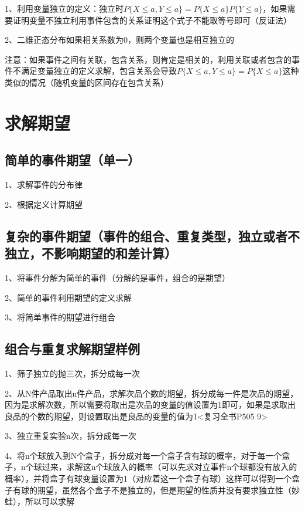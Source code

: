 1、利用变量独立的定义：独立时$P\{X \le a, Y \le a\} = P\{X \le a\}P\{Y \le a\}$，如果需要证明变量不独立利用事件包含的关系证明这个式子不能取等号即可（反证法）

2、二维正态分布如果相关系数为0，则两个变量也是相互独立的

注意：如果事件之间有关联，包含关系，则肯定是相关的，利用关联或者包含的事件不满足变量独立的定义求解，包含关系会导致$P\{X \le a, Y \le a\} = P\{X \le a\}$这种类似的情况（随机变量的区间存在包含关系）

\section{求解期望}



\subsection{简单的事件期望（单一）}

1、求解事件的分布律

2、根据定义计算期望



\subsection{复杂的事件期望（事件的组合、重复类型，独立或者不独立，不影响期望的和差计算）}

1、将事件分解为简单的事件（分解的是事件，组合的是期望）

2、简单的事件利用期望的定义求解

3、将简单事件的期望进行组合



\subsection{组合与重复求解期望样例}

1、筛子独立的抛三次，拆分成每一次

2、从N件产品取出n件产品，求解次品个数的期望，拆分成每一件是次品的期望，因为是求解次数，所以需要将取出是次品的变量的值设置为1即可，如果是求取出良品的个数的期望，则设置取出是良品的变量的值为1<复习全书P505 9>

3、独立重复实验n次，拆分成每一次

4、将n个球放入到N个盒子，拆分成对每一个盒子含有球的概率，对于每一个盒子，n个球过来，求解这n个球放入的概率（可以先求对立事件n个球都没有放入的概率），并将盒子有球变量设置为1（对应着这一个盒子有球）这样可以得到一个盒子有球的期望，虽然各个盒子不是独立的，但是期望的性质并没有要求独立性（妙蛙），所以可以求解

